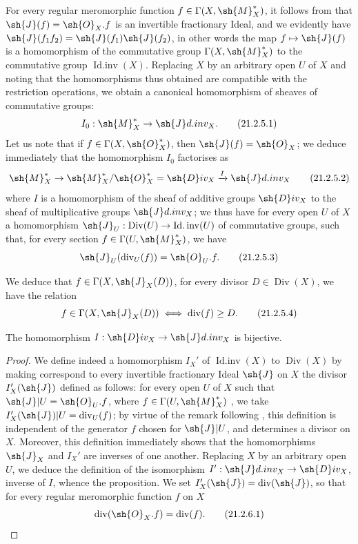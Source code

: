 \begin{env}[21.2.5]
\label{IV.21.2.5}
For every regular meromorphic function $f\in\Gamma(X,\sh{M}_X^*)$, it follows from  that $\sh{J}(f)=\sh{O}_X.f$ is an invertible fractionary Ideal, and we evidently have $\sh{J}(f_1f_2)=\sh{J}(f_1)\sh{J}(f_2)$, in other words the map $f\mapsto\sh{J}(f)$ is a homomorphism of the commutative group $\Gamma(X,\sh{M}_X^*)$ to the commutative group $\operatorname{Id.inv}(X)$.
Replacing $X$ by an arbitrary open $U$ of $X$ and noting that the homomorphisms thus obtained are compatible with the restriction operations, we obtain a canonical homomorphism of sheaves of commutative groups:
\[
\label{IV.21.2.5.1}
  I_0:\sh{M}_X^*\to\sh{J}d.inv_X.
  \tag{21.2.5.1}
\]
Let us note that if $f\in\Gamma(X,\sh{O}_X^*)$, then $\sh{J}(f)=\sh{O}_X$;
we deduce immediately that the homomorphism $I_0$ factorises as
\[
\label{IV.21.2.5.2}
  \sh{M}_X^*\to\sh{M}_X^*/\sh{O}_X^*=\sh{D}iv_X\xrightarrow{I}\sh{J}d.inv_X
  \tag{21.2.5.2}
\]
where $I$ is a homomorphism of the sheaf of additive groups $\sh{D}iv_X$ to the sheaf of multiplicative groups $\sh{J}d.inv_X$;
we thus have for every open $U$ of $X$ a homomorphism $\sh{J}_U:\operatorname{Div}(U)\to\operatorname{Id.inv}(U)$ of commutative groups, such that, for every section $f\in\Gamma(U,\sh{M}_X^*)$, we have
\[
\label{IV.21.2.5.3}
  \sh{J}_U(\operatorname{div}_U(f))=\sh{O}_U.f.
  \tag{21.2.5.3}
\]
\end{env}

\begin{env}[21.2.5.4]
\label{IV.21.2.5.4}
We deduce that $f\in\Gamma(X,\sh{J}_X(D))$, for every divisor $D\in\operatorname{Div}(X)$, we have the relation
\[
  f\in\Gamma(X,\sh{J}_X(D)) \iff \operatorname{div}(f)\geq D.
  \tag{21.2.5.4}
\]
\end{env}

\begin{proposition}[21.2.6]
\label{IV.21.2.6}
The homomorphism $I:\sh{D}iv_X\to\sh{J}d.inv_X$ is bijective.
\end{proposition}

\begin{proof}
We define indeed a homomorphism $I_X'$ of $\operatorname{Id.inv}(X)$ to $\operatorname{Div}(X)$ by making correspond to every invertible fractionary Ideal $\sh{J}$ on $X$ the divisor $I_X'(\sh{J})$ defined as follows:
for every open $U$ of $X$ such that $\sh{J}|U=\sh{O}_U.f$, where $f\in\Gamma(U,\sh{M}_X^*)$ , we take $I_X'(\sh{J})|U=\operatorname{div}_U(f)$;
by virtue of the remark following , this definition is independent of the generator $f$ chosen for $\sh{J}|U$, and determines a divisor on $X$.
Moreover, this definition immediately shows that the homomorphisms $\sh{J}_X$ and $I_X'$ are inverses of one another.
Replacing $X$ by an arbitrary open $U$, we deduce the definition of the isomorphism $I':\sh{J}d.inv_X\to\sh{D}iv_X$, inverse of $I$, whence the proposition.
We set $I_X'(\sh{J})=\operatorname{div}(\sh{J})$, so that for every regular meromorphic function $f$ on $X$
\[
\label{IV.21.2.6.1}
  \operatorname{div}(\sh{O}_X.f)=\operatorname{div}(f).
  \tag{21.2.6.1}
\]
\end{proof}

